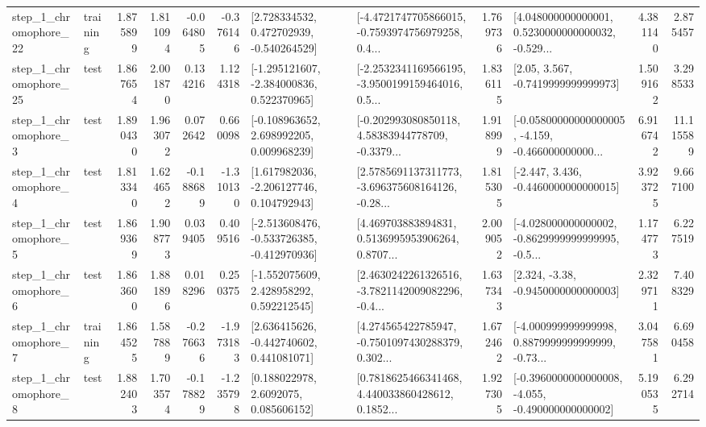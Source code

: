 \begin{tabular}{llrrrrllrlrr}
    step\_1\_chromophore\_22 &  training &      1.875899 &    1.811094 &     -0.064805 & -0.376146 &    [2.728334532, 0.472702939, -0.540264529] &  [-4.4721747705866015, -0.7593974756979258, 0.4... &       1.769736 &  [4.048000000000001, 0.5230000000000032, -0.529... &            4.381140 &          2.875457 \\
    step\_1\_chromophore\_25 &      test &      1.867654 &    2.001870 &      0.134216 &  1.124318 &   [-1.295121607, -2.384000836, 0.522370965] &  [-2.2532341169566195, -3.9500199159464016, 0.5... &       1.836115 &                 [2.05, 3.567, -0.7419999999999973] &            1.509162 &          3.298533 \\
     step\_1\_chromophore\_3 &      test &      1.890430 &    1.963072 &      0.072642 &  0.660098 &    [-0.108963652, 2.698992205, 0.009968239] &  [-0.202993080850118, 4.58383944778709, -0.3379... &       1.918999 &  [-0.05800000000000005, -4.159, -0.466000000000... &            6.916742 &         11.115589 \\
     step\_1\_chromophore\_4 &      test &      1.813340 &    1.624652 &     -0.188689 & -1.310130 &    [1.617982036, -2.206127746, 0.104792943] &  [2.5785691137311773, -3.696375608164126, -0.28... &       1.815305 &               [-2.447, 3.436, -0.4460000000000015] &            3.923725 &          9.667100 \\
     step\_1\_chromophore\_5 &      test &      1.869369 &    1.908773 &      0.039405 &  0.409516 &  [-2.513608476, -0.533726385, -0.412970936] &  [4.469703883894831, 0.5136995953906264, 0.8707... &       2.009052 &  [-4.028000000000002, -0.8629999999999995, -0.5... &            1.174773 &          6.227519 \\
     step\_1\_chromophore\_6 &      test &      1.863600 &    1.881896 &      0.018296 &  0.250375 &    [-1.552075609, 2.428958292, 0.592212545] &  [2.4630242261326516, -3.7821142009082296, -0.4... &       1.637343 &                [2.324, -3.38, -0.9450000000000003] &            2.329711 &          7.408329 \\
     step\_1\_chromophore\_7 &  training &      1.864525 &    1.587889 &     -0.276636 & -1.973183 &    [2.636415626, -0.442740602, 0.441081071] &  [4.274565422785947, -0.7501097430288379, 0.302... &       1.672462 &  [-4.000999999999998, 0.8879999999999999, -0.73... &            3.047581 &          6.690458 \\
     step\_1\_chromophore\_8 &      test &      1.882403 &    1.703574 &     -0.178829 & -1.235798 &       [0.188022978, 2.6092075, 0.085606152] &  [0.7818625466341468, 4.440033860428612, 0.1852... &       1.927305 &  [-0.3960000000000008, -4.055, -0.490000000000002] &            5.190535 &          6.292714 \\

\end{tabular}
